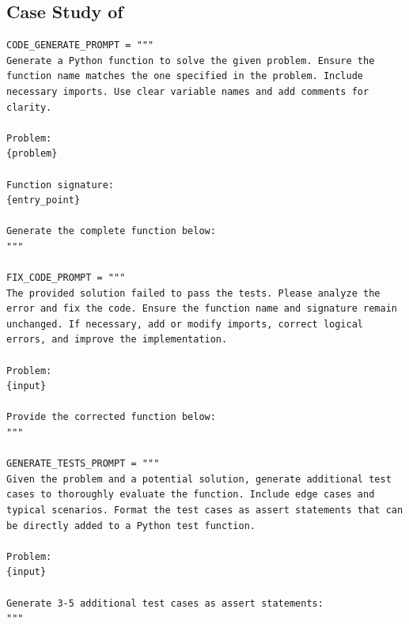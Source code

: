 \subsection{Case Study of \model}
\begin{tcolorbox}[title={\textbf{\small Alpha Codium like workflow for MBPP}}, boxrule=1pt, arc=0mm, colback=black!5!white, colframe=black!75!white, breakable, before skip=10pt, after skip=10pt, pad at break=2mm, parbox=false] \begin{verbatim}
CODE_GENERATE_PROMPT = """
Generate a Python function to solve the given problem. Ensure the function name matches the one specified in the problem. Include necessary imports. Use clear variable names and add comments for clarity.

Problem:
{problem}

Function signature:
{entry_point}

Generate the complete function below:
"""

FIX_CODE_PROMPT = """
The provided solution failed to pass the tests. Please analyze the error and fix the code. Ensure the function name and signature remain unchanged. If necessary, add or modify imports, correct logical errors, and improve the implementation.

Problem:
{input}

Provide the corrected function below:
"""

GENERATE_TESTS_PROMPT = """
Given the problem and a potential solution, generate additional test cases to thoroughly evaluate the function. Include edge cases and typical scenarios. Format the test cases as assert statements that can be directly added to a Python test function.

Problem:
{input}

Generate 3-5 additional test cases as assert statements:
"""


\end{verbatim}
\end{tcolorbox}
